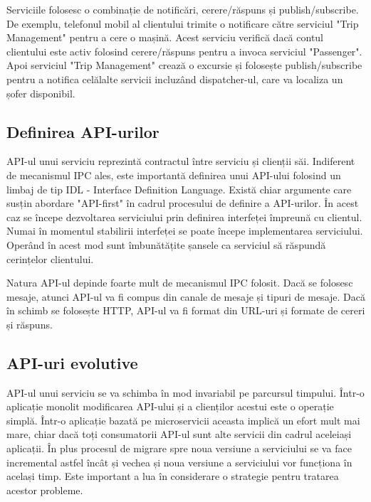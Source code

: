 \documentclass[12pt, a4paper, oneside, romanian]{teza-upb}
\begin{document}
Serviciile folosesc o combinație de notificări, cerere/răspuns și publish/subscribe. De exemplu, telefonul mobil al clientului trimite o notificare către serviciul "Trip Management" pentru a cere o mașină. Acest serviciu verifică dacă contul clientului este activ folosind cerere/răspuns pentru a invoca serviciul "Passenger". Apoi serviciul "Trip Management" crează o excursie și folosește publish/subscribe pentru a notifica celălalte servicii incluzând dispatcher-ul, care va localiza un șofer disponibil. 

\subsection{Definirea API-urilor}

API-ul unui serviciu reprezintă contractul între serviciu și clienții săi. Indiferent de mecanismul IPC ales, este importantă definirea unui API-ului folosind un limbaj de tip IDL - Interface Definition Language. Există chiar argumente care susțin abordare "API-first" în cadrul procesului de definire a API-urilor. În acest caz se începe dezvoltarea serviciului prin definirea interfeței împreună cu clientul. Numai în momentul stabilirii interfeței se poate începe implementarea serviciului. Operând în acest mod sunt îmbunătățite șansele ca serviciul să răspundă cerințelor clientului. 

Natura API-ul depinde foarte mult de mecanismul IPC folosit. Dacă se folosesc mesaje, atunci API-ul va fi compus din canale de mesaje și tipuri de mesaje. Dacă în schimb se folosește HTTP, API-ul va fi format din URL-uri și formate de cereri și răspuns. 

\subsection{API-uri evolutive}

API-ul unui serviciu se va schimba în mod invariabil pe parcursul timpului. Într-o aplicație monolit modificarea API-ului și a clienților acestui este o operație simplă. Într-o aplicație bazată pe microservicii aceasta implică un efort mult mai mare, chiar dacă toți consumatorii API-ul sunt alte servicii din cadrul aceleiași aplicații. În plus procesul de migrare spre noua versiune a serviciului se va face incremental astfel încât și vechea și noua versiune a serviciului vor funcționa în același timp. Este important a lua în considerare o strategie pentru tratarea acestor probleme. 
\end{document}
